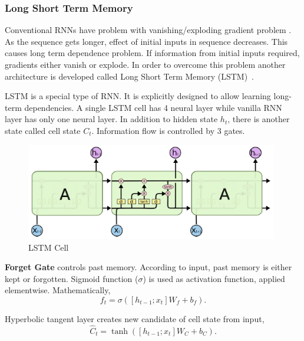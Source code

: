 \subsubsection{Long Short Term Memory}

Conventional RNNs have problem with vanishing/exploding gradient problem \cite{olah_understanding_2015}. 
As the sequence gets longer, effect of initial inputs in sequence decreases. 
This causes long term dependence problem. 
If information from initial inputs required, gradients either vanish or explode. 
In order to overcome this problem another architecture is developed called Long Short Term Memory (LSTM)~\cite{hochreiter_long_1997}. 

LSTM is a special type of RNN. 
It is explicitly designed to allow learning long-term dependencies. 
A single LSTM cell has 4 neural layer while vanilla RNN layer has only one neural layer. 
In addition to hidden state $h_t$, there is another state called cell state $C_t$. 
Information flow is controlled by 3 gates. 

\begin{figure}
	\centering
	\includegraphics[width=0.98\textwidth]{figures/ml_theory/lstm/lstm_module.png}
	\caption{LSTM Cell~\cite{olah_understanding_2015}}
	\label{fig:lstm_cell}
\end{figure}

\textbf{Forget Gate} controls past memory. 
According to input, past memory is either kept or forgotten. 
Sigmoid function ($\sigma$) is used as activation function, applied elementwise. Mathematically, 
\begin{equation}
\label{eqn:lstm_forget}
f_t = \sigma( [h_{t-1}; x_t] W_f + b_f).
\end{equation}

Hyperbolic tangent layer creates new candidate of cell state from input, 
\begin{equation}
\label{eqn:lstm_cellstcand}
\hat{C}_t = \tanh( [h_{t-1}; x_t] W_C + b_C).
\end{equation}

